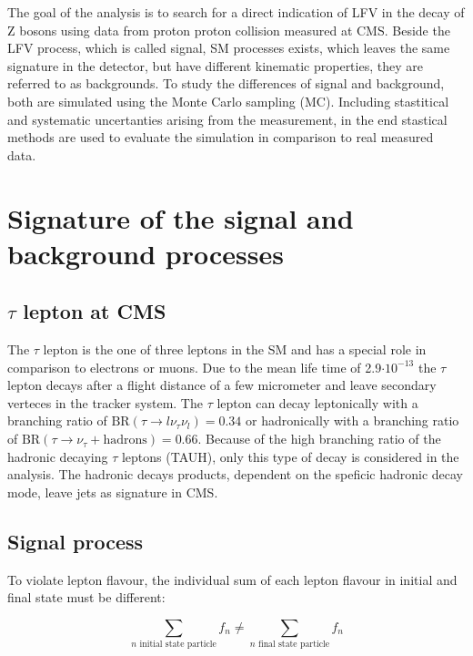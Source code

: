 The goal of the analysis is to search for a direct indication of \gls{LFV} in the decay of Z bosons using data from proton proton collision measured at \gls{CMS}. Beside the \gls{LFV} process, which is called signal, \gls{SM} processes exists, which leaves the same signature in the detector, but have different kinematic properties, they are referred to as backgrounds. To study the differences of signal and background, both are simulated using the Monte Carlo sampling (\gls{MC}). Including stastitical and systematic uncertanties arising from the measurement, in the end stastical methods are used to evaluate the simulation in comparison to real measured data. 

\section{Signature of the signal and background processes}

\subsection{$\tau$ lepton at \gls{CMS}}
\label{sec:section_3_1_1}

The $\tau$ lepton \cite{TAU} is the one of three leptons in the \gls{SM} and has a special role in comparison to electrons or muons. Due to the mean life time of 2.9$\cdot 10^{-13}$ the $\tau$ lepton decays after a flight distance of a few micrometer and leave secondary verteces in the tracker system. The $\tau$ lepton can decay leptonically with a branching ratio of $\text{BR}(\tau \to l\nu_{\tau}\nu_{l}) = 0.34$ or hadronically with a branching ratio of $\text{BR}(\tau \to \nu_{\tau} + \text{hadrons}) = 0.66$. Because of the high branching ratio of the hadronic decaying $\tau$ leptons (\gls{TAUH}), only this type of decay is considered in the analysis. The hadronic decays products, dependent on the speficic hadronic decay mode, leave jets as signature in \gls{CMS}.

\subsection{Signal process}
\label{sec:section_3_1_2}

To violate lepton flavour, the individual sum of each lepton flavour in initial and final state must be different: 

\begin{equation}
	\label{eq:eq_3_1}
	\sum_{n \text{ initial state particle}} f_{n} \neq  \sum_{n \text{ final state particle}} f_{n}
\end{equation}

